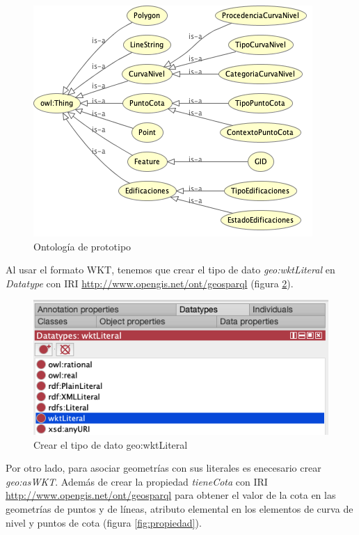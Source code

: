 \begin{figure}[H]
	\centering
	\includegraphics[width=0.7\linewidth]{imagenes/capitulo5/ontologia}
	\caption{Ontología de prototipo}
	\label{fig:ontologia}
\end{figure}

Al usar el formato WKT, tenemos que crear el tipo de dato \textit{geo:wktLiteral} en \textit{Datatype} con IRI \url{http://www.opengis.net/ont/geosparql} (figura \ref{fig:datatype}).


\begin{figure}[H]
	\centering
	\includegraphics[width=0.7\linewidth]{imagenes/capitulo5/datatype}
	\caption{Crear el tipo de dato geo:wktLiteral}
	\label{fig:datatype}
\end{figure}

Por otro lado, para asociar geometrías con sus literales es enecesario crear \textit{geo:asWKT}. Además de crear la propiedad \textit{tieneCota} con IRI \url{http://www.opengis.net/ont/geosparql} para obtener el valor de la cota en las geometrías de puntos y de líneas, atributo elemental en los elementos de curva de nivel y puntos de cota (figura \ref{fig:propiedad}).




